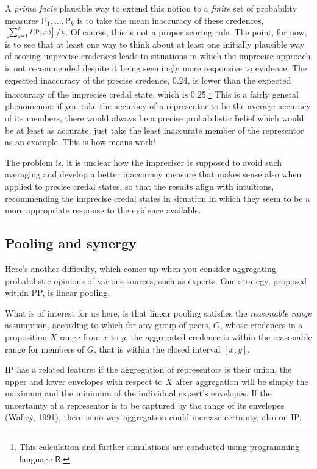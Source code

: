 \documentclass[
  10pt,
  dvipsnames,enabledeprecatedfontcommands]{scrartcl}
\begin{document}
A \emph{prima facie} plausible way to extend this notion to a
\emph{finite} set of probability measures
\(\mathsf{P}_1, \dots, \mathsf{P}_k\) is to take the mean inaccuracy of
these credences,
\(\nicefrac{\left[\sum_{j=1}^k I(\mathsf{P}_j,v)\right]\,\,}{\,k}\). Of
course, this is not a proper scoring rule. The point, for now, is to see
that at least one way to think about at least one initially plausible
way of scoring imprecise credences leads to situations in which the
imprecise approach is not recommended despite it being seemingly more
responsive to evidence. The expected inaccuracy of the precise credence,
0.24, is lower than the expected inaccuracy of the imprecise credal
state, which is
0.25.\footnote{This calculation and further simulations are conducted using  programming language \textbf{$\mathsf{R}$}.}
This is a fairly general phenomenon: if you take the accuracy of a
representor to be the average accuracy of its members, there would
always be a precise probabilistic belief which would be at least as
accurate, just take the least inaccurate member of the representor as an
example. This is how means work!

\noindent The problem is, it is unclear how the impreciser is supposed
to avoid such averaging and develop a better inaccuracy measure that
makes sense also when applied to precise credal states, so that the
results align with intuitions, recommending the imprecise credal states
in situation in which they seem to be a more appropriate response to the
evidence available.

\hypertarget{pooling-and-synergy}{%
\subsection{Pooling and synergy}\label{pooling-and-synergy}}

Here's another difficulty, which comes up when you consider aggregating
probabilistic opinions of various sources, such as experts. One
strategy, proposed within PP, is linear pooling.

What is of interest for us here, is that linear pooling satisfies the
\emph{reasonable  range} assumption, according to which for any group of
peers, \(G\), whose credences in a proposition \(X\) range from \(x\) to
\(y\), the aggregated credence is within the reasonable range for
members of \(G\), that is within the closed interval \([x, y]\).

IP has a related feature: if the aggregation of representors is their
union, the upper and lower envelopes with respect to \(X\) after
aggregation will be simply the maximum and the minimum of the individual
expert's envelopes. If the uncertainty of a representor is to be
captured by the range of its envelopes (Walley, 1991), there is no way
aggregation could increase certainty, also on IP.
\end{document}

